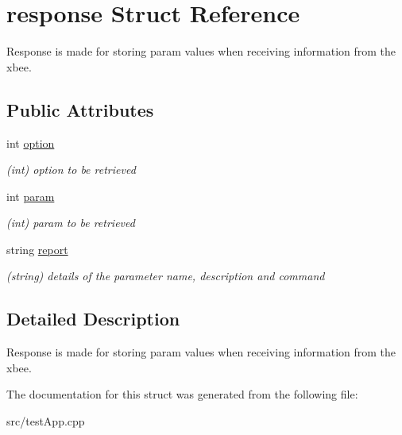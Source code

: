 \hypertarget{structresponse}{
\section{response Struct Reference}
\label{structresponse}
}


Response is made for storing param values when receiving information from the xbee.  


\subsection*{Public Attributes}
\begin{DoxyCompactItemize}
\item 
\hypertarget{structresponse_a747d2d6942be2f6bf9c49a3f5235d051}{
int \hyperlink{structresponse_a747d2d6942be2f6bf9c49a3f5235d051}{option}}
\label{structresponse_a747d2d6942be2f6bf9c49a3f5235d051}

\begin{DoxyCompactList}\small\item\em (int) option to be retrieved \end{DoxyCompactList}\item 
\hypertarget{structresponse_ac92175e8d183a8d87beaaab10c0e0655}{
int \hyperlink{structresponse_ac92175e8d183a8d87beaaab10c0e0655}{param}}
\label{structresponse_ac92175e8d183a8d87beaaab10c0e0655}

\begin{DoxyCompactList}\small\item\em (int) param to be retrieved \end{DoxyCompactList}\item 
\hypertarget{structresponse_aa7567a41012f1f7ad5c4607aca6cc781}{
string \hyperlink{structresponse_aa7567a41012f1f7ad5c4607aca6cc781}{report}}
\label{structresponse_aa7567a41012f1f7ad5c4607aca6cc781}

\begin{DoxyCompactList}\small\item\em (string) details of the parameter name, description and command \end{DoxyCompactList}\end{DoxyCompactItemize}


\subsection{Detailed Description}
Response is made for storing param values when receiving information from the xbee. 

The documentation for this struct was generated from the following file:\begin{DoxyCompactItemize}
\item 
src/testApp.cpp\end{DoxyCompactItemize}
